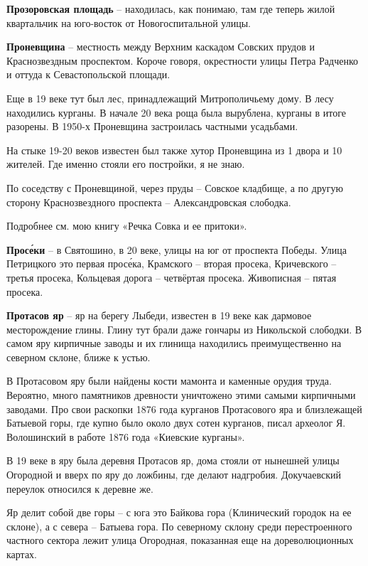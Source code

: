\medskip


\textbf{Прозоровская площадь} – находилась, как понимаю, там где теперь жилой квартальчик на юго-восток от Новогоспитальной улицы.\\

\medskip


\textbf{Проневщина} – местность между Верхним каскадом Совских прудов и Краснозвездным проспектом. Короче говоря, окрестности улицы Петра Радченко и оттуда к Севастопольской площади.

Еще в 19 веке тут был лес, принадлежащий Митрополичьему дому. В лесу находились курганы. В начале 20 века роща была вырублена, курганы в итоге разорены. В 1950-х Проневщина застроилась частными усадьбами.

На стыке 19-20 веков известен был также хутор Проневщина из 1 двора и 10 жителей. Где именно стояли его постройки, я не знаю.

По соседству с Проневщиной, через пруды – Совское кладбище, а по другую сторону Краснозвездного проспекта – Александровская слободка. 

Подробнее см. мою книгу «Речка Совка и ее притоки».\\

\medskip

\textbf{Прос\'еки} – в Святошино, в 20 веке, улицы на юг от проспекта Победы. Улица Петрицкого это первая прос\'ека, Крамского – вторая просека, Кричевского – третья просека, Кольцевая дорога – четвёртая просека. Живописная – пятая просека.\\

\medskip


\textbf{Протасов яр} – яр на берегу Лыбеди, известен в 19 веке как дармовое месторождение глины. Глину тут брали даже гончары из Никольской слободки. В самом яру кирпичные заводы и их глинища находились преимущественно на северном склоне, ближе к устью.

В Протасовом яру были найдены кости мамонта и каменные орудия труда. Вероятно, много памятников древности уничтожено этими самыми кирпичными заводами. Про свои раскопки 1876 года курганов Протасового яра и близлежащей Батыевой горы, где купно было около двух сотен курганов, писал археолог Я. Волошинский в работе 1876 года «Киевские курганы».

В 19 веке в яру была деревня Протасов яр, дома стояли от нынешней улицы Огородной и вверх по яру до ложбины, где делают надгробия. Докучаевский переулок относился к деревне же.

Яр делит собой две горы – с юга это Байкова гора (Клинический городок на ее склоне), а с севера – Батыева гора. По северному склону среди перестроенного частного сектора лежит улица Огородная, показанная еще на дореволюционных картах. 

